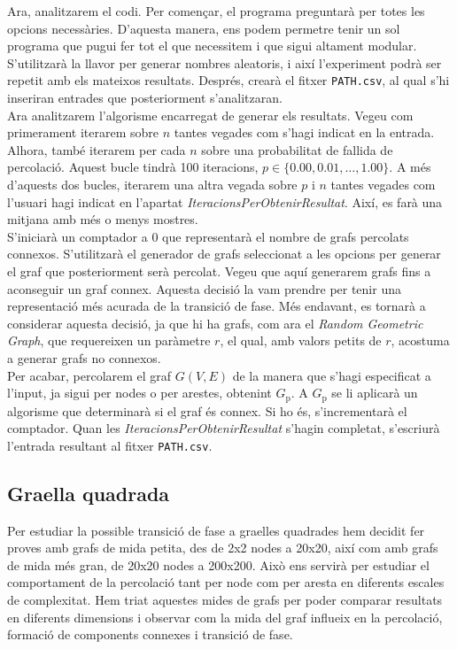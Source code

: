 \documentclass[a4paper]{article}
\begin{document}
	Ara, analitzarem el codi. Per començar, el programa preguntarà per totes les opcions necessàries. D'aquesta manera, ens podem permetre tenir un sol programa que pugui fer tot el que necessitem i que sigui altament modular. S'utilitzarà la llavor per generar nombres aleatoris, i així l'experiment podrà ser repetit amb els mateixos resultats. Després, crearà el fitxer \texttt{PATH.csv}, al qual s'hi inseriran entrades que posteriorment s'analitzaran. \\
	
	Ara analitzarem l'algorisme encarregat de generar els resultats. Vegeu com primerament iterarem sobre $n$ tantes vegades com s'hagi indicat en la entrada. Alhora, també iterarem per cada $n$ sobre una probabilitat de fallida de percolació. Aquest bucle tindrà 100 iteracions, $p \in \{0.00, 0.01, \dots, 1.00\}$. A més d'aquests dos bucles, iterarem una altra vegada sobre $p$ i $n$ tantes vegades com l'usuari hagi indicat en l'apartat \textit{IteracionsPerObtenirResultat}. Així, es farà una mitjana amb més o menys mostres. \\
	
	S'iniciarà un comptador a 0 que representarà el nombre de grafs percolats connexos. S'utilitzarà el generador de grafs seleccionat a les opcions per generar el graf que posteriorment serà percolat. Vegeu que aquí generarem grafs fins a aconseguir un graf connex. Aquesta decisió la vam prendre per tenir una representació més acurada de la transició de fase. Més endavant, es tornarà a considerar aquesta decisió, ja que hi ha grafs, com ara el \textit{Random Geometric Graph}, que requereixen un paràmetre $r$, el qual, amb valors petits de $r$, acostuma a generar grafs no connexos. \\
	
	Per acabar, percolarem el graf $G(V,E)$ de la manera que s'hagi especificat a l'input, ja sigui per nodes o per arestes, obtenint $G_{\text{p}}$. A $G_{\text{p}}$ se li aplicarà un algorisme que determinarà si el graf és connex. Si ho és, s'incrementarà el comptador. Quan les \textit{IteracionsPerObtenirResultat} s'hagin completat, s'escriurà l'entrada resultant al fitxer \texttt{PATH.csv}.
	
	\subsection{Graella quadrada}
	
	Per estudiar la possible transició de fase a graelles quadrades hem decidit fer proves amb grafs de mida petita, des de 2x2 nodes a 20x20, així com amb grafs de mida més gran, de 20x20 nodes a 200x200. Això ens servirà per estudiar el comportament de la percolació tant per node com per aresta en diferents escales de complexitat. Hem triat aquestes mides de grafs per poder comparar resultats en diferents dimensions i observar com la mida del graf influeix en la percolació, formació de components connexes i transició de fase.
	
\end{document}
